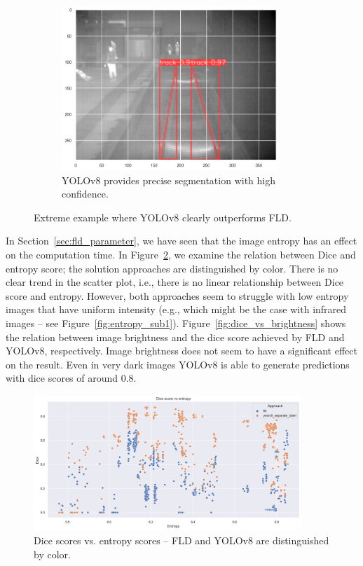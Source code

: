 \documentclass[Master,MDS,english]{BASE/twbook} %
\begin{document}
\begin{figure}
\begin{subfigure}[t]{.33\textwidth}
  \includegraphics[width=0.9\textwidth]{images/results/example_4_yolo}
  \caption{YOLOv8 provides precise segmentation with high confidence. }
\end{subfigure}
\caption{Extreme example where YOLOv8 clearly outperforms FLD.}
\label{fig:res_example4}
\end{figure}


In Section~\ref{sec:fld_parameter}, we have seen that the image entropy has an effect on the computation time. In Figure~\ref{fig:dice_vs_entropy}, we examine the relation between Dice and entropy score; the solution approaches are distinguished by color. There is no clear trend in the scatter plot, i.e., there is no linear relationship between Dice score and entropy. However,  both approaches seem to struggle with low entropy images that have uniform intensity  (e.g., which might be the case with infrared images -- see Figure~\ref{fig:entropy_sub1}).
Figure~\ref{fig:dice_vs_brightness} shows the relation between image brightness and the dice score achieved by FLD and YOLOv8, respectively.  Image brightness does not seem to have a significant effect on the result. Even in very dark images YOLOv8 is able to generate predictions with dice scores of around 0.8. 

\begin{figure}[h]
\centering
\includegraphics[width=0.9\textwidth]{images/results/dice_vs_entropy_nl}
\caption{Dice scores vs. entropy scores -- FLD and YOLOv8 are distinguished by color.  }
\label{fig:dice_vs_entropy}
\end{figure}
\end{document}
